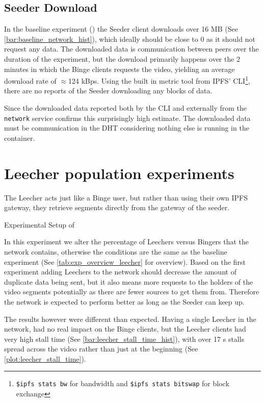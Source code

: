 \subsection{Seeder Download}
\label{sec:eval_seeder_rx}
In the baseline experiment () the Seeder client downloads over 16 \ac{MB} (See \autoref{bar:baseline_network_hist}), which ideally should be close to 0 as it should not request any data. The downloaded data is communication between peers over the duration of the experiment, but the download primarily happens over the 2 minutes in which the Binge clients requests the video, yielding an average download rate of $\approx$124 \ac{kBps}. Using the built in metric tool from \ac{IPFS}' \ac{CLI}\footnote{\texttt{\$ipfs stats bw} for bandwidth and \texttt{\$ipfs stats bitswap} for block exchange}, there are no reports of the Seeder downloading any blocks of data.

Since the downloaded data reported both by the \ac{CLI} and externally from the \texttt{network} service confirms this surprisingly high estimate. The downloaded data must be communication in the \acs{DHT} considering nothing else is running in the container.


\FloatBarrier \section{Leecher population experiments}
\label{sec:eval_leecher}
The Leecher acts just like a Binge user, but rather than using their own \ac{IPFS} gateway, they retrieve segments directly from the gateway of the seeder.

\begin{table}[!htbp]
\myfloatalign
\caption[Experimental Setup of Leecher]{Experimental Setup of }
\label{tab:exp_overview_leecher}

\end{table}

In this experiment we alter the percentage of Leechers versus Bingers that the network contains, otherwise the conditions are the same as the baseline experiment (See \autoref{tab:exp_overview_leecher} for overview).
Based on the first experiment adding Leechers to the network should decrease the amount of duplicate data being sent, but it also means more requests to the holders of the video segments potentially as there are fewer sources to get them from. Therefore the network is expected to perform better as long as the Seeder can keep up.

The results however were different than expected. Having a single Leecher in the network, had no real impact on the Binge clients, but the Leecher clients had very high stall time (See \autoref{bar:leecher_stall_time_hist}), with over 17 \ac{s} stalls spread across the video rather than just at the beginning (See \autoref{plot:leecher_stall_time}). 

